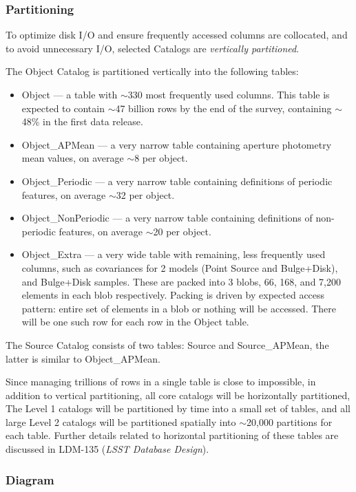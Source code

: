 \documentclass[DM,lsstdraft,toc]{lsstdoc}
\begin{document}
\subsubsection{Partitioning}

To optimize disk I/O and ensure frequently accessed columns are collocated, and to avoid unnecessary I/O, selected Catalogs are \textit{vertically partitioned}.

The Object Catalog is partitioned vertically into the following tables: 

\begin{itemize}
  \item Object --- a table with $\sim$330 most frequently used columns. This table is expected to contain $\sim$47 billion rows by the end of the survey, containing $\sim$48\% in the first data release.
  \item Object\_APMean --- a very narrow table containing aperture photometry mean values, on average $\sim$8 per object.
  \item Object\_Periodic --- a very narrow table containing definitions of periodic features, on average $\sim$32 per object.
  \item Object\_NonPeriodic --- a very narrow table containing definitions of non-periodic features, on average $\sim$20 per object.
  \item Object\_Extra --- a very wide table with remaining, less frequently used columns, such as covariances for 2 models (Point Source and Bulge+Disk), and Bulge+Disk samples. These are packed into 3 blobs, 66, 168, and 7,200 elements in each blob respectively. Packing is driven by expected access pattern: entire set of elements in a blob or nothing will be accessed. There will be one such row for each row in the Object table.
\end{itemize}

The Source Catalog consists of two tables: Source and Source\_APMean, the latter is similar to Object\_APMean.

Since managing trillions of rows in a single table is close to impossible, in addition to vertical partitioning, all core catalogs will be horizontally partitioned, The Level 1 catalogs will be partitioned by time into a small set of tables, and all large Level 2 catalogs will be partitioned spatially into $\sim$20,000 partitions for each table. Further details related to horizontal partitioning of these tables are discussed in LDM-135 (\textit{LSST Database Design}).

\subsubsection{Diagram}
\end{document}
